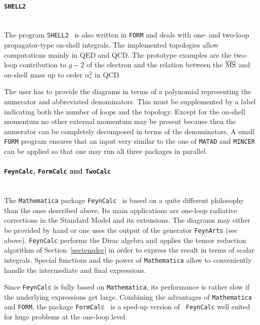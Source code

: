 \paragraph{{\tt SHELL2}}\mbox{}\\[1em]
%
The program {\tt SHELL2}~\cite{SHELL2} is also written in {\tt FORM} and
deals with one- and two-loop propagator-type on-shell integrals.  The
implemented topologies allow computations mainly in QED and QCD.  The
prototype examples are the two-loop contribution to $g-2$ of the
electron and the relation between the $\overline{\rm MS}$ and
on-shell mass up to order $\alpha_s^2$ in QCD.

The user has to provide the diagrams in terms of a polynomial
representing the numerator and abbreviated denominators. This must be
supplemented by a label indicating both the number of loops and the
topology. Except for the on-shell momentum no other external momentum
may be present because then the numerator can be completely decomposed
in terms of the denominators.  A small {\tt FORM} program ensures that an
input very similar to the one of {\tt MATAD} and {\tt MINCER} can be
applied so that one may run all three packages in parallel.


\paragraph{{\tt FeynCalc}, {\tt FormCalc} and {\tt TwoCalc}}\mbox{}\\[1em]
%
The {\tt Mathematica} package {\tt FeynCalc}~\cite{FeynCalc} is based on
a quite different philosophy than the ones described above.  Its main
applications are one-loop radiative corrections in the Standard Model and
its extensions. The diagrams may either be provided by hand or one uses
the output of the generator {\tt FeynArts} (see above).  {\tt FeynCalc}
performs the Dirac algebra and applies the tensor reduction algorithm of
Section~\ref{sectensdec} in order to express the result in terms of
scalar integrals. Special functions and the power of {\tt Mathematica}
allow to conveniently handle the intermediate and final expressions.

Since {\tt FeynCalc} is fully based on {\tt Mathematica}, its
performance is rather slow if the underlying expressions get large.
Combining the advantages of {\tt Mathematica} and {\tt FORM}, the
package {\tt FormCalc}~\cite{FormCalc} is a sped-up version of {\tt
  FeynCalc} well suited for huge problems at the one-loop level.

